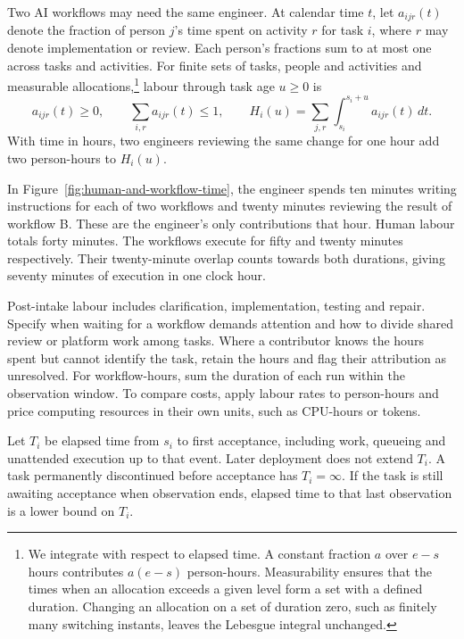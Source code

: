 \documentclass[11pt,a4paper]{amsart}
\begin{document}
Two AI workflows may need the same engineer. At calendar time $t$, let $a_{ijr}(t)$ denote the fraction of person $j$'s time spent on activity $r$ for task $i$, where $r$ may denote implementation or review. Each person's fractions sum to at most one across tasks and activities. For finite sets of tasks, people and activities and measurable allocations,\footnote{We integrate with respect to elapsed time. A constant fraction $a$ over $e-s$ hours contributes $a(e-s)$ person-hours. Measurability ensures that the times when an allocation exceeds a given level form a set with a defined duration. Changing an allocation on a set of duration zero, such as finitely many switching instants, leaves the Lebesgue integral unchanged.} labour through task age $u\geq0$ is
\begin{equation}
\label{eq:labour}
 a_{ijr}(t)\geq0,\qquad \sum_{i,r}a_{ijr}(t)\leq1,\qquad
 H_i(u)=\sum_{j,r}\int_{s_i}^{s_i+u}a_{ijr}(t)\,dt.
\end{equation}
With time in hours, two engineers reviewing the same change for one hour add two person-hours to $H_i(u)$.

In Figure~\ref{fig:human-and-workflow-time}, the engineer spends ten minutes writing instructions for each of two workflows and twenty minutes reviewing the result of workflow B. These are the engineer's only contributions that hour. Human labour totals forty minutes. The workflows execute for fifty and twenty minutes respectively. Their twenty-minute overlap counts towards both durations, giving seventy minutes of execution in one clock hour.



Post-intake labour includes clarification, implementation, testing and repair. Specify when waiting for a workflow demands attention and how to divide shared review or platform work among tasks. Where a contributor knows the hours spent but cannot identify the task, retain the hours and flag their attribution as unresolved. For workflow-hours, sum the duration of each run within the observation window. To compare costs, apply labour rates to person-hours and price computing resources in their own units, such as CPU-hours or tokens.

Let $T_i$ be elapsed time from $s_i$ to first acceptance, including work, queueing and unattended execution up to that event. Later deployment does not extend $T_i$. A task permanently discontinued before acceptance has $T_i=\infty$. If the task is still awaiting acceptance when observation ends, elapsed time to that last observation is a lower bound on $T_i$.
\end{document}
